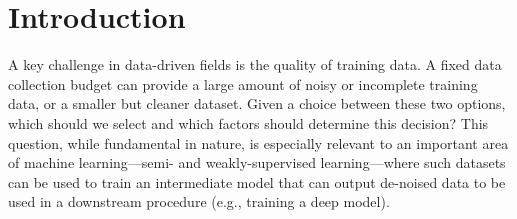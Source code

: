 \section{Introduction}

A key challenge in data-driven fields is the quality of training data. A fixed data collection budget can provide a large amount of noisy or incomplete training data, or a smaller but cleaner dataset. Given a choice between these two options, which should we select and which factors should determine this decision? This question, while fundamental in nature, is especially relevant to an important area of machine learning---semi- and weakly-supervised learning---where such datasets can be used to train an intermediate model that can output de-noised data to be used in a downstream procedure (e.g., training a deep model).



%



